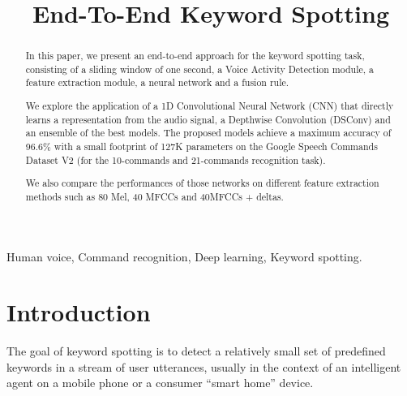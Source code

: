 \documentclass[conference]{IEEEtran}
\begin{document}
\title{End-To-End Keyword Spotting}
\author{
\and
{}
}

\maketitle

\begin{abstract}
In this paper, we present an end-to-end approach for the keyword spotting task, consisting of a sliding window of one second, a Voice Activity Detection module, a feature extraction module, a neural network and a fusion rule.

We explore the application of a 1D Convolutional Neural Network (CNN) that directly learns a representation from the audio signal, a Depthwise Convolution (DSConv) and an ensemble of the best models.
The proposed models achieve a maximum accuracy of 96.6\% with a small footprint of 127K parameters on the Google Speech Commands Dataset V2 (for the 10-commands and 21-commands recognition task).

We also compare the performances of those networks on different feature extraction methods such as 80 Mel, 40 MFCCs and 40MFCCs + deltas.
\end{abstract}

\IEEEpeerreviewmaketitle
\begin{IEEEkeywords}
Human voice, Command recognition, Deep learning, Keyword spotting.
\end{IEEEkeywords}

\section{Introduction}
The goal of keyword spotting is to detect a relatively small set of predefined keywords in a stream of user utterances, usually in the context of an intelligent agent on a mobile phone or a consumer “smart home” device.
\end{document}
